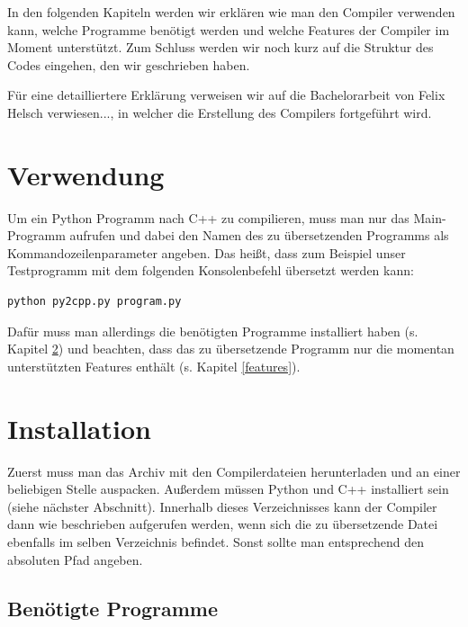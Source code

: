

In den folgenden Kapiteln werden wir erklären wie man den Compiler verwenden kann, welche Programme benötigt werden und welche Features der Compiler im Moment unterstützt. Zum Schluss werden wir noch kurz auf die Struktur des Codes eingehen, den wir geschrieben haben.

Für eine detailliertere Erklärung verweisen wir auf die Bachelorarbeit von Felix Helsch verwiesen..., in welcher die Erstellung des Compilers fortgeführt wird.



\section{Verwendung}

Um ein Python Programm nach C++ zu compilieren, muss man nur das Main-Programm  aufrufen und dabei den Namen des zu übersetzenden Programms als Kommandozeilenparameter angeben. Das heißt, dass zum Beispiel unser Testprogramm  mit dem folgenden Konsolenbefehl übersetzt werden kann:
\begin{lstlisting}
python py2cpp.py program.py
\end{lstlisting}
Dafür muss man allerdings die benötigten Programme installiert haben (s. Kapitel \ref{progs}) und beachten, dass das zu übersetzende Programm nur die momentan unterstützten Features enthält (s. Kapitel \ref{features}).


\section{Installation} \label{progs}

Zuerst muss man das Archiv mit den Compilerdateien herunterladen \cite{py2cpp} und an einer beliebigen Stelle auspacken.
Außerdem müssen Python und C++ installiert sein (siehe nächster Abschnitt).
Innerhalb dieses Verzeichnisses kann der Compiler dann wie beschrieben aufgerufen werden, wenn sich die zu übersetzende Datei ebenfalls im selben Verzeichnis befindet.
Sonst sollte man entsprechend den absoluten Pfad angeben.


\subsection{Benötigte Programme}

